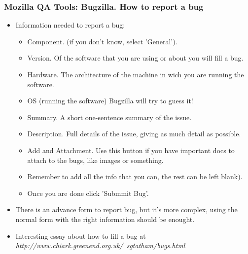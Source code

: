 \documentclass{beamer}
\begin{document}
\begin{frame}
 \frametitle{Mozilla QA Tools: Bugzilla. How to report a bug}
 \begin{itemize}
    \item Information needed to report a bug:
    \begin{itemize}
      \item Component. (if you don't know, select 'General').
      \item Version. Of the software that you are using or about you will fill a bug.
      \item Hardware. The architecture of the machine in wich you are running the software.
      \item OS (running the software) Bugzilla will try to guess it!
      \item Summary. A short one-sentence summary of the issue.
      \item Description. Full details of the issue, giving as much detail as possible.
      \item Add and Attachment. Use this button if you have important docs to attach to the bugs, like images or something.
      \item Remember to add all the info that you can, the rest can be left blank).
      \item Once you are done click 'Submmit Bug'.
      \end{itemize}
     \item There is an advance form to report  bug, but it's more complex, using the normal form with the right information should be enought.
     \item Interesting essay about how to fill a bug at \textit{http://www.chiark.greenend.org.uk/~sgtatham/bugs.html}
 \end{itemize}
\end{frame}

\end{document}
